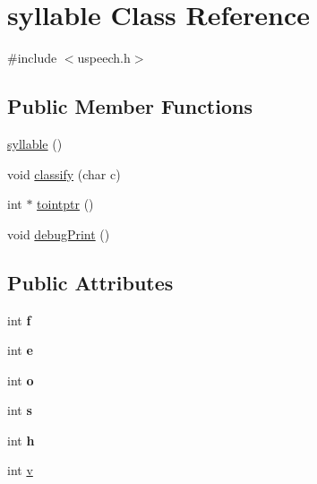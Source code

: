 \hypertarget{classsyllable}{\section{syllable Class Reference}
\label{classsyllable}
}


{\ttfamily \#include $<$uspeech.\-h$>$}

\subsection*{Public Member Functions}
\begin{DoxyCompactItemize}
\item 
\hyperlink{classsyllable_a291affba67abd6153d1f915708f69fea}{syllable} ()
\item 
void \hyperlink{classsyllable_ac96f3746c2809f61641bbd84d8a54d6c}{classify} (char c)
\item 
int $\ast$ \hyperlink{classsyllable_a0098736a4e24ef25f99f5931f557f9be}{tointptr} ()
\item 
void \hyperlink{classsyllable_a541d6d839787682f075fee01a498b511}{debug\-Print} ()
\end{DoxyCompactItemize}
\subsection*{Public Attributes}
\begin{DoxyCompactItemize}
\item 
\hypertarget{classsyllable_ae3fda13a6215b399041e95de95a04033}{int {\bfseries f}}\label{classsyllable_ae3fda13a6215b399041e95de95a04033}

\item 
\hypertarget{classsyllable_ad9f67cc4fde291811160b7b0d550828a}{int {\bfseries e}}\label{classsyllable_ad9f67cc4fde291811160b7b0d550828a}

\item 
\hypertarget{classsyllable_a866c1da80432c27b617e828b10555bf2}{int {\bfseries o}}\label{classsyllable_a866c1da80432c27b617e828b10555bf2}

\item 
\hypertarget{classsyllable_a187ccc69a6a8c75c0d3b8eef2df058e8}{int {\bfseries s}}\label{classsyllable_a187ccc69a6a8c75c0d3b8eef2df058e8}

\item 
\hypertarget{classsyllable_a2b09344ec090d843ffea4f9ab766d904}{int {\bfseries h}}\label{classsyllable_a2b09344ec090d843ffea4f9ab766d904}

\item 
int \hyperlink{classsyllable_a4cec2f8c6bee7e16ec7071ed630f0c33}{v}
\end{DoxyCompactItemize}



